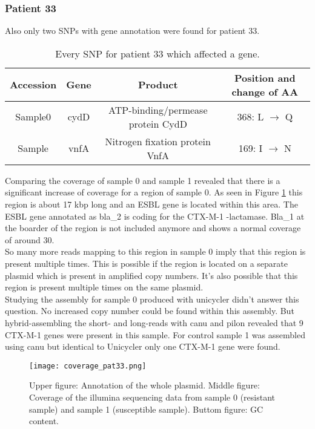 \subsubsection{Patient 33}
Also only two SNPs with gene annotation were found for patient 33.
\begin{table}[H]
	\begin{tabular}{|c c c c|}	
		\hline
		Accession & Gene & Product & Position and change of AA \\ [0.5ex]
		\hline\hline
		Sample0   & cydD & ATP-binding/permease protein CydD   & 368: L $\rightarrow$ Q               \\
		\hline
		Sample   & vnfA & Nitrogen fixation protein VnfA   & 169: I $\rightarrow$ N               \\
		\hline
	\end{tabular}
	\caption{Every SNP for patient 33 which affected a gene.}
	\label{table:pat33_snp_annotated}
\end{table}	

Comparing the coverage of sample 0 and sample 1 revealed that there is a significant increase of coverage for a region of sample 0. As seen in Figure \ref{figure:coverage} this region is about 17 kbp long and an ESBL gene is located within this area. The ESBL gene annotated as bla\_2 is coding for the CTX-M-1 \textbeta-lactamase. Bla\_1 at the boarder of the region is not included anymore and shows a normal coverage of around 30. \\
So many more reads mapping to this region in sample 0 imply that this region is present multiple times. This is possible if the region is located on a separate plasmid which is present in amplified copy numbers. It's also possible that this region is present multiple times on the same plasmid. \\
Studying the assembly for sample 0 produced with unicycler didn't answer this question. No increased copy number could be found within this assembly. But hybrid-assembling the short- and long-reads with canu and pilon revealed that 9 CTX-M-1 genes were present in this sample. For control sample 1 was assembled using canu but identical to Unicycler only one CTX-M-1 gene were found.



\begin{figure}
	\texttt{[image: coverage\_pat33.png]}
	\caption{Upper figure: Annotation of the whole plasmid. Middle figure: Coverage of the illumina sequencing data from sample 0 (resistant sample) and sample 1 (susceptible sample). Buttom figure: GC content.}
	\label{figure:coverage}
\end{figure}

